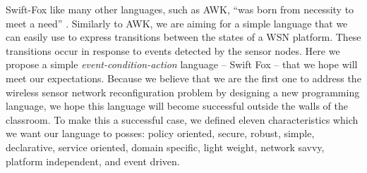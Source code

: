 \documentclass[11pt]{article}
\begin{document}
Swift-Fox like many other languages, such as AWK, ``was born from necessity
to meet a need'' \cite{aho:2008}. Similarly to AWK, we are aiming for a
simple language that we can easily use to express transitions between the
states of a WSN platform. These transitions occur in response to events
detected by the sensor nodes. Here we propose a simple
\textit{event-condition-action} language -- Swift Fox -- that we hope
will meet our expectations. Because we believe that we are the first one to
address the wireless sensor network reconfiguration problem by designing
a new programming language, we hope this language will become successful
outside the walls of the classroom. To make this a successful case, we
defined eleven characteristics which we want our language to posses: policy
oriented, secure, robust, simple, declarative, service oriented, 
domain specific, light weight, network savvy, platform independent, 
and event driven.


\end{document}

